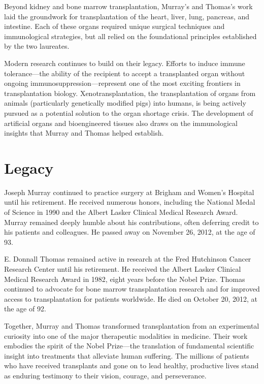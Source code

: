 Beyond kidney and bone marrow transplantation, Murray's and Thomas's work laid the groundwork for transplantation of the heart, liver, lung, pancreas, and intestine. Each of these organs required unique surgical techniques and immunological strategies, but all relied on the foundational principles established by the two laureates.

Modern research continues to build on their legacy. Efforts to induce immune tolerance---the ability of the recipient to accept a transplanted organ without ongoing immunosuppression---represent one of the most exciting frontiers in transplantation biology. Xenotransplantation, the transplantation of organs from animals (particularly genetically modified pigs) into humans, is being actively pursued as a potential solution to the organ shortage crisis. The development of artificial organs and bioengineered tissues also draws on the immunological insights that Murray and Thomas helped establish.

\section{Legacy}

Joseph Murray continued to practice surgery at Brigham and Women's Hospital until his retirement. He received numerous honors, including the National Medal of Science in 1990 and the Albert Lasker Clinical Medical Research Award. Murray remained deeply humble about his contributions, often deferring credit to his patients and colleagues. He passed away on November 26, 2012, at the age of 93.

E. Donnall Thomas remained active in research at the Fred Hutchinson Cancer Research Center until his retirement. He received the Albert Lasker Clinical Medical Research Award in 1982, eight years before the Nobel Prize. Thomas continued to advocate for bone marrow transplantation research and for improved access to transplantation for patients worldwide. He died on October 20, 2012, at the age of 92.

Together, Murray and Thomas transformed transplantation from an experimental curiosity into one of the major therapeutic modalities in medicine. Their work embodies the spirit of the Nobel Prize---the translation of fundamental scientific insight into treatments that alleviate human suffering. The millions of patients who have received transplants and gone on to lead healthy, productive lives stand as enduring testimony to their vision, courage, and perseverance.


